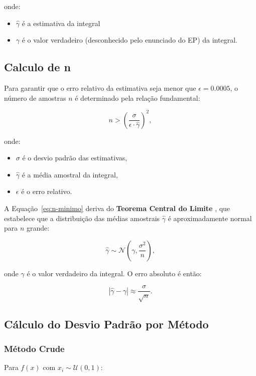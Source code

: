 \documentclass[12pt, a4paper]{article}
\begin{document}
onde:
\begin{itemize}
    \item $\hat{\gamma}$ é a estimativa da integral
    \item $\gamma$ é o valor verdadeiro (desconhecido pelo enunciado do EP) da integral.
\end{itemize}

\subsection{Calculo de n}
\label{sec:teoria-n}

Para garantir que o erro relativo da estimativa seja menor que  $\epsilon = 0.0005$, o número de amostras $n$ é determinado pela relação fundamental:

\begin{equation}
n > \left( \frac{\sigma}{\epsilon \cdot \hat{\gamma}} \right)^2,
\label{eq:n-minimo}
\end{equation}

onde:
\begin{itemize}
    \item $\sigma$ é o desvio padrão das estimativas,
    \item $\hat{\gamma}$ é a média amostral da integral,
    \item $\epsilon$ é o erro relativo.
\end{itemize}


A Equação~\ref{eq:n-minimo} deriva do \textbf{Teorema Central do Limite} , que estabelece que a distribuição das médias amostrais $\hat{\gamma}$ é aproximadamente normal para $n$ grande:

\begin{equation}
\hat{\gamma} \sim \mathcal{N}\left(\gamma, \frac{\sigma^2}{n}\right),
\end{equation}

onde $\gamma$ é o valor verdadeiro da integral. O erro absoluto é então:

\begin{equation}
|\hat{\gamma} - \gamma| \approx \frac{\sigma}{\sqrt{n}}.
\end{equation}

\subsection{Cálculo do Desvio Padrão por Método}

\subsubsection{Método Crude}
Para $f(x)$ com $x_i \sim \mathcal{U}(0,1)$:
\end{document}
